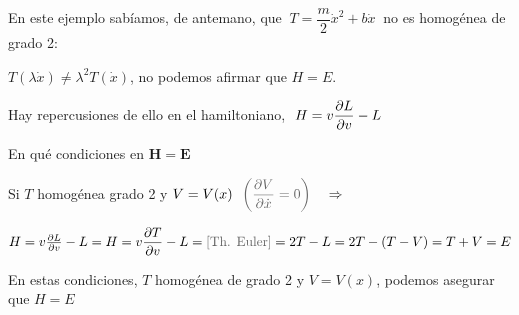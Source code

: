 En este ejemplo sabíamos, de antemano, que $\ T=\dfrac m 2 \dot x^2+b \dot x \ $ no es homogénea de grado 2: 

 $ T(\lambda \dot x) \neq \lambda^2 T(\dot x)$, no podemos afirmar que $H=E$.

Hay repercusiones de ello en el hamiltoniano, $\ H=\displaystyle v \pdv{L}{v}-L \ $

\vspace{5mm}

\begin{myblock}{En qué condiciones en $\boldsymbol{H=E}$}
	
\vspace{3mm} Si $T$ homogénea grado 2 y $\displaystyle V=V(x) \ \ \textcolor{gris}{\left(  \pdv{V}{\dot x}=0 \right)} \quad \Rightarrow $

\vspace{3mm} $H= v \pdv{L}{v}-L = H=\displaystyle v \pdv{T}{v}-L =\textcolor{gris}{[\text{Th. Euler}]}= 2T-L=2T-(T-V)=T+V=E$

\vspace{5mm} En estas condiciones, $T$ homogénea de grado 2 y $V=V(x)$, podemos asegurar que $H=E$
\end{myblock}
